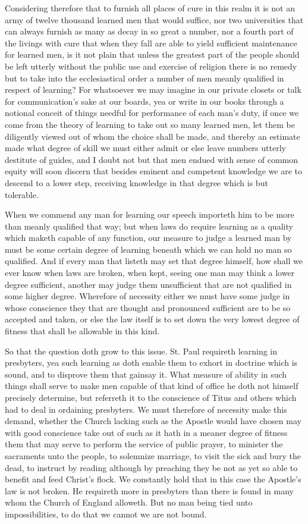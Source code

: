 Considering therefore that to furnish all places of cure in this realm it is not an army of twelve thousand learned men that would suffice, nor two universities that can always furnish as many as decay in so great a number, nor a fourth part of the livings with cure that when they fall are able to yield sufficient maintenance for learned men, is it not plain that unless the greatest part of the people should be left utterly without the public use and exercise of religion there is no remedy but to take into the ecclesiastical order a number of men meanly qualified in respect of learning? For whatsoever we may imagine in our private closets or talk for communication’s sake at our boards, yea or write in our books through a notional conceit of things needful for performance of each man’s duty, if once we come from the theory of learning to take out so many learned men, let them be diligently viewed out of whom the choice shall be made, and thereby an estimate made what degree of skill we must either admit or else leave numbers utterly destitute of guides, and I doubt not but that men endued with sense of common equity will soon discern that besides eminent and competent knowledge we are to descend to a lower step, receiving knowledge in that degree which is but tolerable.

When we commend any man for learning our speech importeth him to be more than meanly qualified that way; but when laws do require learning as a quality which maketh capable of any function, our measure to judge a learned man  by must be some certain degree of learning beneath which we can hold no man so qualified. And if every man that listeth may set that degree himself, how shall we ever know when laws are broken, when kept, seeing one man may think a lower degree sufficient, another may judge them unsufficient that are not qualified in some higher degree. Wherefore of necessity either we must have some judge in whose conscience they that are thought and pronounced sufficient are to be so accepted and taken, or else the law itself is to set down the very lowest degree of fitness that shall be allowable in this kind.

So that the question doth grow to this issue. St. Paul requireth learning in presbyters, yea such learning as doth enable them to exhort in doctrine which is sound, and to disprove them that gainsay it. What measure of ability in such things shall serve to make men capable of that kind of office he doth not himself precisely determine, but referreth it to the conscience of Titus and others which had to deal in ordaining presbyters. We must therefore of necessity make this demand, whether the Church lacking such as the Apostle would have chosen may with good conscience take out of such as it hath in a meaner degree of fitness them that may serve to perform the service of public prayer, to minister the sacraments unto the people, to solemnize marriage, to visit the sick and bury the dead, to instruct by reading although by preaching they be not as yet so able to benefit and feed Christ’s flock. We constantly hold that in this case the Apostle’s law is not broken. He requireth more in presbyters than there is found in many whom the Church of England alloweth. But no man being tied unto impossibilities, to do that we cannot we are not bound.

